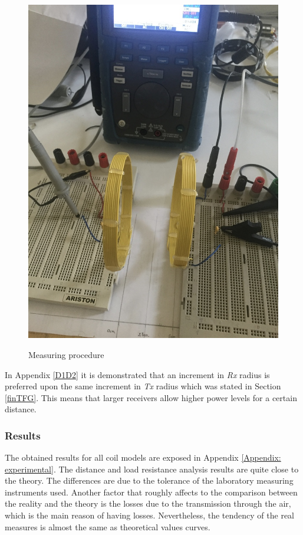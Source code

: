 \begin{figure}[htb]
\begin{center}
\begin{subfigmatrix}{2}
{\includegraphics{./images/LoadAnalysis}\label{F:load}}
\end{subfigmatrix}
\caption{Measuring procedure}
\label{F:procedure}
\end{center}
\end{figure}

In Appendix \ref{D1D2} it is demonstrated that an increment in \textit{Rx} radius is preferred upon the same increment in \textit{Tx} radius which was stated in Section \ref{finTFG}. This means that larger receivers allow higher power levels for a certain distance.

\subsubsection{Results}

The obtained results for all coil models are exposed in Appendix \ref{Appendix: experimental}. The distance and load resistance analysis results are quite close to the theory. The differences are due to the tolerance of the laboratory measuring instruments used. Another factor that roughly affects to the comparison between the reality and the theory is the losses due to the transmission through the air, which is the main reason of having losses. Nevertheless, the tendency of the real measures is almost the same as theoretical values curves.


